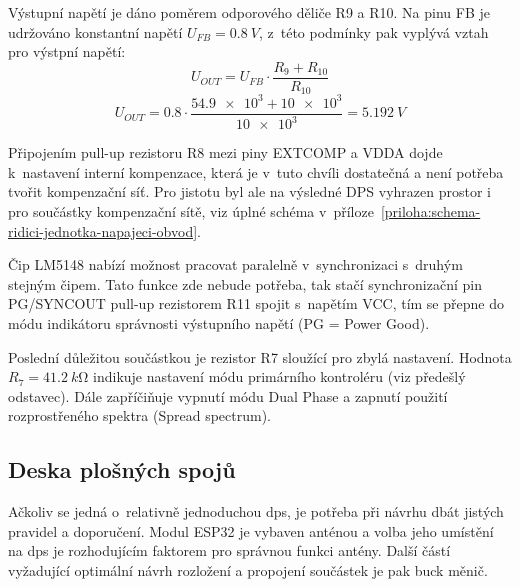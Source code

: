         Výstupní napětí je dáno poměrem odporového děliče R9 a R10. Na pinu FB je udržováno konstantní napětí \(U_{FB} = \qty{0.8}{V}\), z~této podmínky pak vyplývá vztah pro výstpní napětí:
        \begin{equation}
            U_{OUT}  = U_{FB}\cdot \frac{R_{9} +R_{10}}{R_{10}}
        \end{equation}
        \begin{equation}
            U_{OUT}  = \num{0.8}\cdot \frac{\num{54.9e3} +\num{10e3}}{\num{10e3}} = \qty{5.192}{V}
        \end{equation}

        Připojením pull-up rezistoru R8 mezi piny EXTCOMP a VDDA dojde k~nastavení interní kompenzace, která je v~tuto chvíli dostatečná a není potřeba tvořit kompenzační síť. Pro jistotu byl ale na výsledné DPS vyhrazen prostor i pro součástky kompenzační sítě, viz úplné schéma v~příloze~\ref{priloha:schema-ridici-jednotka-napajeci-obvod}. 

        Čip LM5148 nabízí možnost pracovat paralelně v~synchronizaci s~druhým stejným čipem. Tato funkce zde nebude potřeba, tak stačí synchronizační pin PG/SYNCOUT pull-up rezistorem R11 spojit s~napětím VCC, tím se přepne do módu indikátoru správnosti výstupního napětí (PG = Power Good). 

        Poslední důležitou součástkou je rezistor R7 sloužící pro zbylá nastavení. Hodnota \(R_{7} = \qty{41.2}{k\ohm}\) indikuje nastavení módu primárního kontroléru (viz předešlý odstavec). Dále zapříčiňuje vypnutí módu Dual Phase a zapnutí použití rozprostřeného spektra (Spread spectrum).


    \subsection{Deska plošných spojů}
        Ačkoliv se jedná o~relativně jednoduchou \acs{dps}, je potřeba při návrhu dbát jistých pravidel a doporučení. Modul ESP32 je vybaven anténou a volba jeho umístění na \acs{dps} je rozhodujícím faktorem pro správnou funkci antény. Další částí vyžadující optimální návrh rozložení a propojení součástek je pak buck měnič. 
        

